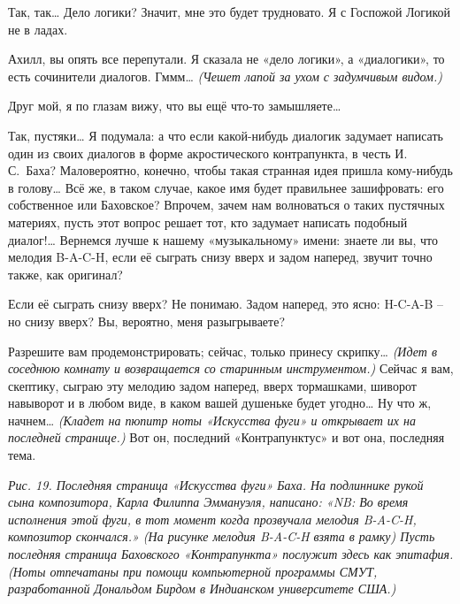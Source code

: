 \documentclass[../main.tex]{subfiles}
\begin{document}
\begin{dialogue}
 Так, так\ldots{} Дело логики? Значит, мне это будет трудновато. Я с Госпожой Логикой не в ладах.

 Ахилл, вы опять все перепутали. Я сказала не «дело логики», а «диалогики», то есть сочинители диалогов. Гммм\ldots{} \emph{(Чешет лапой за ухом с задумчивым видом.)}

 Друг мой, я по глазам вижу, что вы ещё что-то замышляете\ldots{}

 Так, пустяки\ldots{} Я подумала: а что если какой-нибудь диалогик задумает написать один из своих диалогов в форме акростического контрапункта, в честь И.\,С.~Баха? Маловероятно, конечно, чтобы такая странная идея пришла кому-нибудь в голову\ldots{} Всё же, в таком случае, какое имя будет правильнее зашифровать: его собственное или Баховское? Впрочем, зачем нам волноваться о таких пустячных материях, пусть этот вопрос решает тот, кто задумает написать подобный диалог!\ldots{} Вернемся лучше к нашему «музыкальному» имени: знаете ли вы, что мелодия \mbox{B-A-C-H}, если её сыграть снизу вверх и задом наперед, звучит точно также, как оригинал?

 Если её сыграть снизу вверх? Не понимаю. Задом наперед, это ясно: \mbox{H-C-A-B} \--- но снизу вверх? Вы, вероятно, меня разыгрываете?

 Разрешите вам продемонстрировать; сейчас, только принесу скрипку\ldots{} \emph{(Идет в соседнюю комнату и возвращается со старинным инструментом.)} Сейчас я вам, скептику, сыграю эту мелодию задом наперед, вверх тормашками, шиворот навыворот и в любом виде, в каком вашей душеньке будет угодно\ldots{} Ну что ж, начнем\ldots{} \emph{(Кладет на пюпитр ноты «Искусства фуги» и открывает их на последней странице.)} Вот он, последний «Контрапунктус» и вот она, последняя тема.


\emph{Рис. 19. Последняя страница «Искусства фуги» Баха. На подлиннике рукой сына композитора, Карла Филиппа Эммануэля, написано: «NB: Во время исполнения этой фуги, в тот момент когда прозвучала мелодия \mbox{B-A-C-H}, композитор скончался.» (На рисунке мелодия \mbox{B-A-C-H} взята в рамку) Пусть последняя страница Баховского «Контрапункта» послужит здесь как эпитафия. (Ноты отпечатаны при помощи компьютерной программы СМУТ, разработанной Дональдом Бирдом в Индианском университете США.)}

\end{dialogue}
\end{document}
